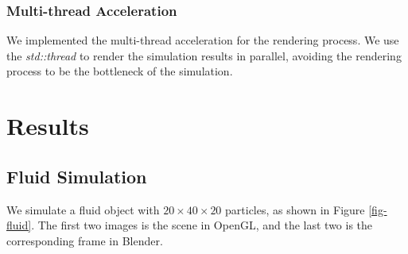 \subsubsection{Multi-thread Acceleration} We implemented the multi-thread acceleration for the rendering process. We use the \textit{std::thread} to render the simulation results in parallel, avoiding the rendering process to be the bottleneck of the simulation.

\section{Results}

\subsection{Fluid Simulation}

We simulate a fluid object with $20\times 40\times 20$ particles, as shown in Figure \ref{fig-fluid}. The first two images is the scene in OpenGL, and the last two is the corresponding frame in Blender.

